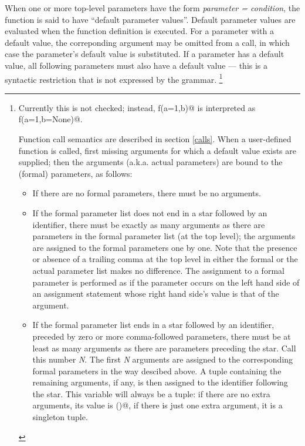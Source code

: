 When one or more top-level parameters have the form {\em parameter =
condition}, the function is said to have ``default parameter values''.
Default parameter values are evaluated when the function definition is
executed.  For a parameter with a default value, the correponding
argument may be omitted from a call, in which case the parameter's
default value is substituted.  If a parameter has a default value, all
following parameters must also have a default value --- this is a
syntactic restriction that is not expressed by the grammar.%
\footnote{Currently this is not checked; instead,
\verb@def f(a=1,b)@ is interpreted as \verb@def f(a=1,b=None)@.

Function call semantics are described in section \ref{calls}.  When a
user-defined function is called, first missing arguments for which a
default value exists are supplied; then the arguments (a.k.a. actual
parameters) are bound to the (formal) parameters, as follows:

\begin{itemize}

\item
If there are no formal parameters, there must be no arguments.

\item
If the formal parameter list does not end in a star followed by an
identifier, there must be exactly as many arguments as there are
parameters in the formal parameter list (at the top level); the
arguments are assigned to the formal parameters one by one.  Note that
the presence or absence of a trailing comma at the top level in either
the formal or the actual parameter list makes no difference.  The
assignment to a formal parameter is performed as if the parameter
occurs on the left hand side of an assignment statement whose right
hand side's value is that of the argument.

\item
If the formal parameter list ends in a star followed by an identifier,
preceded by zero or more comma-followed parameters, there must be at
least as many arguments as there are parameters preceding the star.
Call this number {\em N}.  The first {\em N} arguments are assigned to
the corresponding formal parameters in the way descibed above.  A
tuple containing the remaining arguments, if any, is then assigned to
the identifier following the star.  This variable will always be a
tuple: if there are no extra arguments, its value is \verb@()@, if
there is just one extra argument, it is a singleton tuple.


\end{itemize}}
